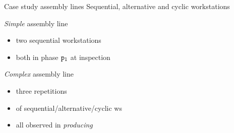   \begin{frame}{Case study assembly lines}
    Sequential, alternative and cyclic workstations
    
    \vspace{0.5em}
    \begin{minipage}{0.3\textwidth}
      \begin{center}\scalebox{0.5}{}\end{center}
    \end{minipage}
    \begin{minipage}{0.325\textwidth}
      \begin{center}\scalebox{0.5}{}\end{center}
    \end{minipage}
    \begin{minipage}{0.325\textwidth}
      \begin{center}\scalebox{0.5}{}\end{center}
    \end{minipage}
    
    \vspace{1em}
    \begin{minipage}{0.5\textwidth}
      \textit{Simple} assembly line
      \begin{itemize}
        \item two sequential workstations
        \item both in phase $\mathtt{p}_1$ at inspection
      \end{itemize}
    \end{minipage}
    \begin{minipage}{0.45\textwidth}
      \begin{center}\scalebox{0.7}{}\end{center}
    \end{minipage}
    
    \vspace{2em}
    \begin{minipage}{0.5\textwidth}
      \textit{Complex} assembly line
      \begin{itemize}
        \item three repetitions
        \item of sequential/alternative/cyclic ws
        \item all observed in \textit{producing}
      \end{itemize}
    \end{minipage}
    \begin{minipage}{0.45\textwidth}
      \begin{center}\scalebox{0.7}{}\end{center}
    \end{minipage}
  \end{frame}
  
